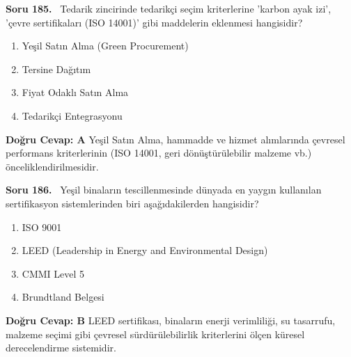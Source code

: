 \documentclass[11pt,a4paper,openany]{book}
\begin{document}
\needspace{5cm}
\vspace{8pt}
\noindent\textbf{\large\sffamily Soru 185.} \ Tedarik zincirinde tedarikçi seçim kriterlerine 'karbon ayak izi', 'çevre sertifikaları (ISO 14001)' gibi maddelerin eklenmesi hangisidir?
\begin{enumerate}[label=\Alph*), leftmargin=25pt, topsep=4pt, itemsep=2pt]
    \item Yeşil Satın Alma (Green Procurement)
    \item Tersine Dağıtım
    \item Fiyat Odaklı Satın Alma
    \item Tedarikçi Entegrasyonu
\end{enumerate}
\vspace{4pt}
\begin{tcolorbox}[title=Cevap ve Açıklama, colback=gray!3!white, colframe=primarycolor!90!black, arc=2mm, fonttitle=\bfseries\sffamily, top=6pt, bottom=6pt]
    \textbf{Doğru Cevap: A}
    \vspace{2pt}
    Yeşil Satın Alma, hammadde ve hizmet alımlarında çevresel performans kriterlerinin (ISO 14001, geri dönüştürülebilir malzeme vb.) önceliklendirilmesidir.
\end{tcolorbox}
\vspace{10pt}

\needspace{5cm}
\vspace{8pt}
\noindent\textbf{\large\sffamily Soru 186.} \ Yeşil binaların tescillenmesinde dünyada en yaygın kullanılan sertifikasyon sistemlerinden biri aşağıdakilerden hangisidir?
\begin{enumerate}[label=\Alph*), leftmargin=25pt, topsep=4pt, itemsep=2pt]
    \item ISO 9001
    \item LEED (Leadership in Energy and Environmental Design)
    \item CMMI Level 5
    \item Brundtland Belgesi
\end{enumerate}
\vspace{4pt}
\begin{tcolorbox}[title=Cevap ve Açıklama, colback=gray!3!white, colframe=primarycolor!90!black, arc=2mm, fonttitle=\bfseries\sffamily, top=6pt, bottom=6pt]
    \textbf{Doğru Cevap: B}
    \vspace{2pt}
    LEED sertifikası, binaların enerji verimliliği, su tasarrufu, malzeme seçimi gibi çevresel sürdürülebilirlik kriterlerini ölçen küresel derecelendirme sistemidir.
\end{tcolorbox}
\vspace{10pt}
\end{document}
